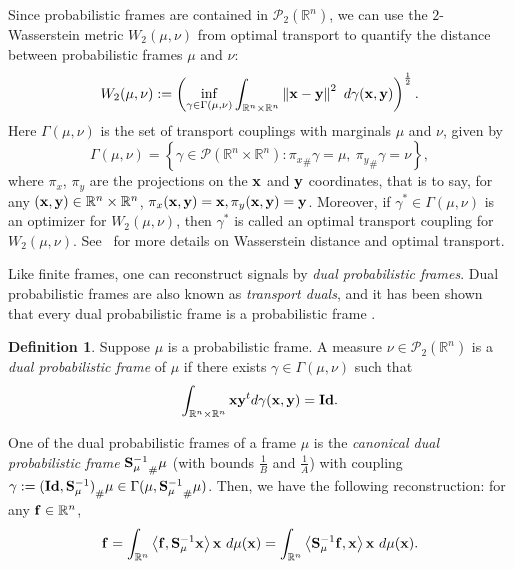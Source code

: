 \documentclass{amsart}
\numberwithin{equation}{section}
\theoremstyle{plain}
\theoremstyle{remark}
\theoremstyle{definition}
\newtheorem{definition}[theorem]{Definition}
\begin{document}
Since probabilistic frames are contained in $\mathcal{P}_2(\mathbb{R}^n)$, we can use the $2$-Wasserstein metric $ W_2(\mu,\nu)$ from optimal transport to quantify the distance between probabilistic frames $\mu$ and $\nu$:  
$$ W_2(\mu,\nu) := \left ( \underset{\gamma \in \Gamma(\mu,\nu)}{\operatorname{inf}}  \int_{\mathbb{R}^n \times \mathbb{R}^n}  \left \Vert {\bf x}-{\bf y}\right \Vert^2 \ d\gamma({\bf x},{\bf y}) \right )^{\frac{1}{2}}.$$
Here $\Gamma(\mu,\nu)$ is the set of transport couplings with marginals $\mu$ and $\nu$, given by 
$$ \Gamma(\mu,\nu) =  \left \{ \gamma \in \mathcal{P}(\mathbb{R}^n \times \mathbb{R}^n): {\pi_{{ x}}}_{\#} \gamma = \mu, \ {\pi_{{ y}}}_{\#} \gamma = \nu \right \},$$
where $\pi_{{ x}}$, $\pi_{{ y}}$ are the projections on the ${\bf x}$ and ${\bf y}$ coordinates, that is to say,  for any $({\bf x},{\bf y}) \in \mathbb{R}^n \times \mathbb{R}^n $, $\pi_{{ x}}({\bf x}, {\bf y}) = {\bf x}, \pi_{{ y}}({\bf x},{\bf y}) = {\bf y}$. Moreover, if $\gamma^* \in \Gamma(\mu, \nu)$ is an optimizer for $ W_2(\mu,\nu)$, then $\gamma^*$ is called an optimal transport coupling for $ W_2(\mu,\nu)$. See~\cite{figalli2021invitation} for more details on Wasserstein distance and optimal transport.



Like finite frames, one can reconstruct signals by \emph{dual probabilistic frames}. Dual probabilistic frames are also known as \emph{transport duals}, and it has been shown that every dual probabilistic frame is a probabilistic frame \cite{wickman2014optimal}. 

\begin{definition}\label{dualDefinition}
Suppose $\mu$ is a probabilistic frame. A measure $\nu \in \mathcal{P}_2(\mathbb{R}^n)$ is a \emph{dual probabilistic frame} of $\mu$ if there exists $\gamma \in \Gamma(\mu, \nu)$ such that 
\begin{equation*}
   \int_{\mathbb{R}^n \times \mathbb{R}^n} {\bf x}{\bf y}^t d\gamma({\bf x}, {\bf y}) = {\bf Id}.
\end{equation*}
\end{definition}

One of the dual probabilistic frames of a frame $\mu$ is the \emph{canonical dual probabilistic frame} ${{\bf S}_\mu^{-1}}_{\#}\mu$ (with bounds $\frac{1}{B}$ and $ \frac{1}{A}$) with coupling $\gamma:= {({\bf Id}, {\bf S}_\mu^{-1})}_{\#}\mu \in \Gamma(\mu, {{\bf S}_\mu^{-1}}_{\#}\mu)$. 
Then, we have the following reconstruction: for any ${\bf f} \in \mathbb{R}^n$, 
\begin{equation*}
   {\bf f}=   \int_{\mathbb{R}^n} \left\langle  {\bf f}, {\bf S}_\mu^{-1} {\bf x} \right\rangle {\bf x} \ d\mu({\bf x}) =\int_{\mathbb{R}^n} \left\langle  {\bf S}_\mu^{-1} {\bf f}, {\bf x} \right\rangle {\bf x} \ d\mu({\bf x}). 
\end{equation*}
\end{document}

